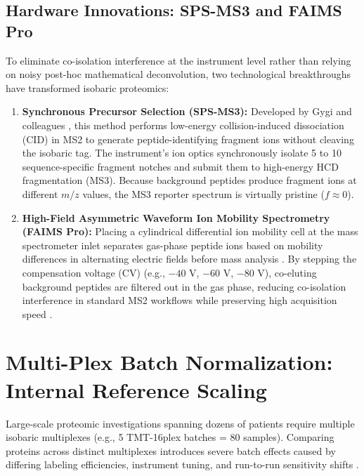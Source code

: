 \documentclass[11pt,oneside]{book}
\begin{document}
\subsection{Hardware Innovations: SPS-MS3 and FAIMS Pro}
To eliminate co-isolation interference at the instrument level rather than relying on noisy post-hoc mathematical deconvolution, two technological breakthroughs have transformed isobaric proteomics:

\begin{enumerate}
    \item \textbf{Synchronous Precursor Selection (SPS-MS3):} Developed by Gygi and colleagues \cite{ting2011sps, mcalister2012multinotch, mcalister2014multinotch}, this method performs low-energy collision-induced dissociation (CID) in MS2 to generate peptide-identifying fragment ions without cleaving the isobaric tag. The instrument's ion optics synchronously isolate 5 to 10 sequence-specific fragment notches and submit them to high-energy HCD fragmentation (MS3). Because background peptides produce fragment ions at different $m/z$ values, the MS3 reporter spectrum is virtually pristine ($f \approx 0$).
    \item \textbf{High-Field Asymmetric Waveform Ion Mobility Spectrometry (FAIMS Pro):} Placing a cylindrical differential ion mobility cell at the mass spectrometer inlet separates gas-phase peptide ions based on mobility differences in alternating electric fields before mass analysis \cite{hebert2018faims, pfammatter2020faims}. By stepping the compensation voltage (CV) (e.g., $-40$ V, $-60$ V, $-80$ V), co-eluting background peptides are filtered out in the gas phase, reducing co-isolation interference in standard MS2 workflows while preserving high acquisition speed \cite{brennan2019faims, schweppe2020high}.
\end{enumerate}

\section{Multi-Plex Batch Normalization: Internal Reference Scaling}

Large-scale proteomic investigations spanning dozens of patients require multiple isobaric multiplexes (e.g., 5 TMT-16plex batches = 80 samples). Comparing proteins across distinct multiplexes introduces severe batch effects caused by differing labeling efficiencies, instrument tuning, and run-to-run sensitivity shifts \cite{plubell2017extended}.
\end{document}
